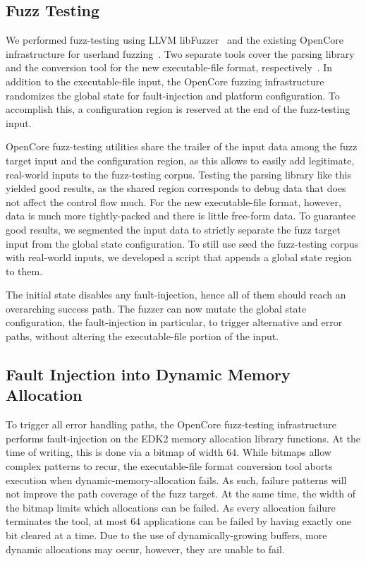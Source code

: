 \subsection{Fuzz Testing}

We performed \gls{fuzz-testing} using LLVM libFuzzer~\cite{libfuzzer} and the existing OpenCore infrastructure for userland fuzzing~\cite{opencore}. Two separate tools cover the parsing library and the conversion tool for the new \gls{executable-file} format, respectively~\cite{thesis-git}. In addition to the \gls{executable-file} input, the OpenCore fuzzing infrastructure randomizes the global state for \gls{fault-injection} and platform configuration. To accomplish this, a configuration region is reserved at the end of the \gls{fuzz-testing} input.

OpenCore \gls{fuzz-testing} utilities share the trailer of the input data among the fuzz target input and the configuration region, as this allows to easily add legitimate, real-world inputs to the \gls{fuzz-testing} corpus. Testing the  parsing library like this yielded good results, as the shared region corresponds to  debug data that does not affect the control flow much. For the new \gls{executable-file} format, however, data is much more tightly-packed and there is little free-form data. To guarantee good results, we segmented the input data to strictly separate the fuzz target input from the global state configuration. To still use seed the \gls{fuzz-testing} corpus with real-world inputs, we developed a script that appends a global state region to them.

The initial state disables any \gls{fault-injection}, hence all of them should reach an overarching success path. The fuzzer can now mutate the global state configuration, the \gls{fault-injection} in particular, to trigger alternative and error paths, without altering the \gls{executable-file} portion of the input.

\subsection{Fault Injection into Dynamic Memory Allocation}

To trigger all error handling paths, the OpenCore \gls{fuzz-testing} infrastructure performs \gls{fault-injection} on the \gls{EDK2} memory allocation library functions. At the time of writing, this is done via a  bitmap of width $64$. While bitmaps allow complex patterns to recur, the \gls{executable-file} format conversion tool aborts execution when \gls{dynamic-memory-allocation} fails. As such, failure patterns will not improve the path coverage of the fuzz target. At the same time, the width of the bitmap limits which allocations can be failed. As every allocation failure terminates the tool, at most $64$ applications can be failed by having exactly one bit cleared at a time. Due to the use of dynamically-growing buffers, more dynamic allocations may occur, however, they are unable to fail.

